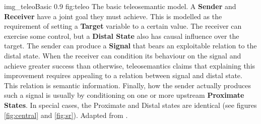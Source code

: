 \begin{myfig}
    {img_teleoBasic} %
    {0.9} %
    {fig:teleo} %
    {The basic teleosemantic model. 
    A \textbf{Sender} and \textbf{Receiver} have a joint goal they must achieve. 
    This is modelled as the requirement of setting a \textbf{Target} variable to a certain value. 
    The receiver can exercise some control, but a \textbf{Distal State} also has causal influence over the target. 
    The sender can produce a \textbf{Signal} that bears an exploitable relation to the distal state.
    When the receiver can condition its behaviour on the signal and achieve greater success than otherwise, teleosemantics claims that explaining this improvement requires appealing to a relation between signal and distal state.
    This relation is semantic information.
    Finally, how the sender actually produces such a signal is usually by conditioning on one or more upstream \textbf{Proximate States}.
    In special cases, the Proximate and Distal states are identical (see figures \ref{fig:central} and \ref{fig:sr}).
    Adapted from \citet[fig. 6.3, p. 78]{millikan2004varieties}.
    } %
\end{myfig}